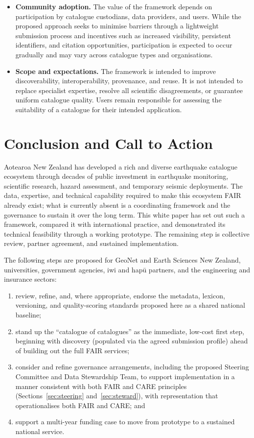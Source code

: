 \documentclass[11pt]{article}
\begin{document}
\begin{itemize}
\item \textbf{Community adoption.} The value of the framework depends on participation by catalogue custodians, data providers, and users. While the proposed approach seeks to minimise barriers through a lightweight submission process and incentives such as increased visibility, persistent identifiers, and citation opportunities, participation is expected to occur gradually and may vary across catalogue types and organisations.
\item \textbf{Scope and expectations.} The framework is intended to improve discoverability, interoperability, provenance, and reuse. It is not intended to replace specialist expertise, resolve all scientific disagreements, or guarantee uniform catalogue quality. Users remain responsible for assessing the suitability of a catalogue for their intended application.
\end{itemize}

\section{Conclusion and Call to Action}
Aotearoa New Zealand has developed a rich and diverse earthquake catalogue ecosystem through decades of public investment in earthquake monitoring, scientific research, hazard assessment, and temporary seismic deployments. The data, expertise, and technical capability required to make this ecosystem FAIR already exist; what is currently absent is a coordinating framework and the governance to sustain it over the long term. This white paper has set out such a framework, compared it with international practice, and demonstrated its technical feasibility through a working prototype. The remaining step is collective review, partner agreement, and sustained implementation.

The following steps are proposed for GeoNet and Earth Sciences New Zealand, universities, government agencies, iwi and hap\=u partners, and the engineering and insurance sectors:
\begin{enumerate}
\setlength{\itemsep}{1pt}
\item review, refine, and, where appropriate, endorse the metadata, lexicon, versioning, and quality-scoring standards proposed here as a shared national baseline;
\item stand up the ``catalogue of catalogues'' as the immediate, low-cost first step, beginning with discovery (populated via the agreed submission profile) ahead of building out the full FAIR services;
\item consider and refine governance arrangements, including the proposed Steering Committee and Data Stewardship Team, to support implementation in a manner consistent with both FAIR and CARE principles (Sections~\ref{sec:steering} and~\ref{sec:steward}), with representation that operationalises both FAIR and CARE; and
\item support a multi-year funding case to move from prototype to a sustained national service.
\end{enumerate}
\end{document}
